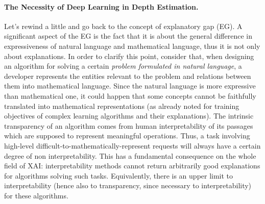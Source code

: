 \vfill

\paragraph{The Necessity of Deep Learning in Depth Estimation.}
Let's rewind a little and go back to the concept of explanatory gap (EG).
A significant aspect of the EG is the fact that it is about the general difference in expressiveness of natural language and mathematical language, thus it is not only about explanations.
In order to clarify this point, consider that, when designing an algorithm for solving a certain \textit{problem formulated in natural language}, a developer represents the entities relevant to the problem and relations between them into mathematical language.
Since the natural language is more expressive than mathematical one, it could happen that some concepts cannot be faithfully translated into mathematical representations (as already noted for training objectives of complex learning algorithms and their explanations).
The intrinsic transparency of an algorithm comes from human interpretability of its passages which are supposed to represent meaningful operations.
Thus, a task involving high-level difficult-to-mathematically-represent requests will always have a certain degree of non interpretability.
This has a fundamental consequence on the whole field of XAI: interpretability methods cannot return arbitrarily good explanations for algorithms solving such tasks.
Equivalently, there is an upper limit to interpretability (hence also to transparency, since necessary to interpretability) for these algorithms.

